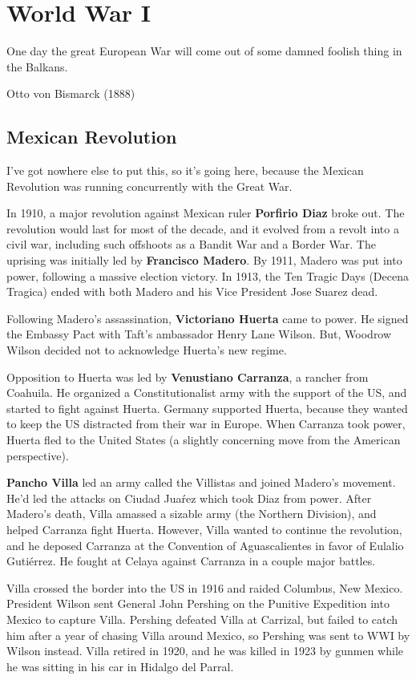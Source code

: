\chapter{World War I}

\epigraph{%
  One day the great European War will come out of some damned foolish thing in the Balkans.
}{Otto von Bismarck (1888)}

\section{Mexican Revolution}

I've got nowhere else to put this, so it's going here,
because the Mexican Revolution was running concurrently with the Great War.

In 1910, a major revolution against Mexican ruler \textbf{Porfirio Diaz} broke out.
The revolution would last for most of the decade, and it evolved from a revolt into a civil war,
including such offshoots as a Bandit War and a Border War.
The uprising was initially led by \textbf{Francisco Madero}.
By 1911, Madero was put into power, following a massive election victory.
In 1913, the Ten Tragic Days (Decena Tragica) ended with both Madero and his Vice President Jose Suarez dead.

Following Madero's assassination, \textbf{Victoriano Huerta} came to power.
He signed the Embassy Pact with Taft's ambassador Henry Lane Wilson.
But, Woodrow Wilson decided not to acknowledge Huerta's new regime.

Opposition to Huerta was led by \textbf{Venustiano Carranza}, a rancher from Coahuila.
He organized a Constitutionalist army with the support of the US,
and started to fight against Huerta.
Germany supported Huerta,
because they wanted to keep the US distracted from their war in Europe.
When Carranza took power, Huerta fled to the United States
(a slightly concerning move from the American perspective).

\textbf{Pancho Villa} led an army called the Villistas and joined Madero's movement.
He'd led the attacks on Ciudad Jua\'rez which took Diaz from power.
After Madero's death, Villa amassed a sizable army (the Northern Division),
and helped Carranza fight Huerta.
However, Villa wanted to continue the revolution,
and he deposed Carranza at the Convention of Aguascalientes in favor of Eulalio Guti\'errez.
He fought at Celaya against Carranza in a couple major battles.

Villa crossed the border into the US in 1916 and raided Columbus, New Mexico.
President Wilson sent General John Pershing on the Punitive Expedition into Mexico to capture Villa.
Pershing defeated Villa at Carrizal,
but failed to catch him after a year of chasing Villa around Mexico,
so Pershing was sent to WWI by Wilson instead.
Villa retired in 1920,
and he was killed in 1923 by gunmen while he was sitting in his car in Hidalgo del Parral.


